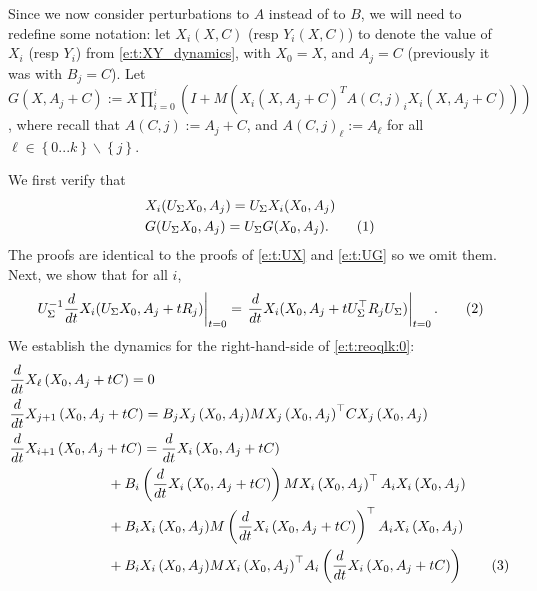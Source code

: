 \documentclass{article}
\newcommand*\lrp[1]{\left( #1 \right)}
\newcommand*\lrbb[1]{\left\{ #1 \right\}}
\newcommand\numberthis{\addtocounter{equation}{1}\tag{\theequation}}
\newcommand*\at[2]{\left.#1\right|_{#2}}
\newcommand{\US}{U_\Sigma}
\begin{document}
Since we now consider perturbations to $A$ instead of to $B$, we will need to redefine some notation: let $X_i(X, C)$ (resp $Y_i(X,C)$) to denote the value of $X_i$ (resp $Y_i$) from \eqref{e:t:XY_dynamics}, with $X_0 = X$, and $A_j = C$ (previously it was with $B_j=C$). Let $G(X, A_j + C) := X \prod_{i=0}^{i} \lrp{I + M \lrp{X_i(X, A_j + C)^T A(C, j)_i X_i(X, A_j + C)}}$, where recall that $A(C,j) := A_j + C$, and $A(C,j)_\ell := A_\ell$ for all $\ell \in \lrbb{0...k} \backslash \lrbb{j}$.

We first verify that 
\begin{align*}
&X_i(\US X_0, A_j) = \US X_i(X_0, A_j)\\
&G(\US X_0, A_j) = \US G(X_0, A_j).
\numberthis \label{e:t:UXGA}
\end{align*}
The proofs are identical to the proofs of \eqref{e:t:UX} and \eqref{e:t:UG} so we omit them. Next, we show that for all $i$,
\begin{align*}
\at{\US^{-1} \frac{d}{dt} X_i(\US X_0, A_j + t R_j)}{t=0} = \at{\frac{d}{dt} X_i(X_0, A_j + t \US^{\top} R_j \US)}{t=0}.
\numberthis \label{e:t:reoqlk:0}
\end{align*}
We establish the dynamics for the right-hand-side of \eqref{e:t:reoqlk:0}:
{\allowdisplaybreaks
\begin{align*}
& \frac{d}{dt} X_{\ell} \lrp{X_0, A_j + t C} = 0\\
& \frac{d}{dt} X_{j+1} \lrp{X_0, A_j + t C} = B_j {X_{j}\lrp{X_0, A_j}} M {X_{j}\lrp{X_0, A_j}}^{\top} C  {X_{j}\lrp{X_0, A_j}}\\
& \frac{d}{dt} X_{i+1} \lrp{X_0, A_j + t C}
= \frac{d}{dt} X_{i} \lrp{X_0, A_j + t C}\\
&\qquad\qquad\qquad\quad+ B_i \lrp{\frac{d}{dt} X_{i}\lrp{X_0, A_j + t C}} M X_{i}\lrp{X_0, A_j}^{\top} A_i  X_{i}\lrp{X_0, A_j}\\
&\qquad\qquad\qquad\quad + B_i {X_{i}\lrp{X_0, A_j}} M \lrp{\frac{d}{dt} X_{i}\lrp{X_0, A_j + tC}}^{\top} A_i  X_{i}\lrp{X_0, A_j}\\
&\qquad\qquad\qquad\quad + B_i {X_{i}\lrp{X_0, A_j}} M {X_{i}\lrp{X_0, A_j}}^{\top} A_i  \lrp{\frac{d}{dt}X_{i}\lrp{X_0, A_j+tC}}
\numberthis \label{e:t:reoqlk:1}
\end{align*}
}
\end{document}
